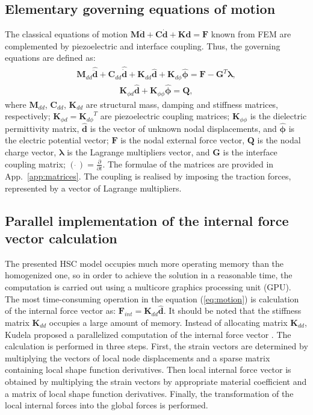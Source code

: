 \documentclass[sensors,article,submit,moreauthors,pdftex]{Definitions/mdpi}
\begin{document}
\subsection{Elementary governing equations of motion}
\label{sec:motion}
The classical equations of motion \(\textbf{M}\ddot{\textbf{d}} + \textbf{C}\dot{\textbf{d}} + \textbf{K}\textbf{d} = \textbf{F}\) known from FEM are complemented by piezoelectric and interface coupling. Thus, the governing equations are defined as:
\begin{eqnarray}
\textbf{M}_{dd} \widehat{\ddot{\textbf{d}}} + \textbf{C}_{dd} \widehat{\dot{\textbf{d}}} + \textbf{K}_{dd} \widehat{\textbf{d}} + \textbf{K}_{d\phi} \widehat{\boldsymbol{\phi}} = \textbf{F} - \textbf{G}^T \boldsymbol{\lambda},
\label{eq:motion}
\end{eqnarray}
\begin{eqnarray}
\textbf{K}_{\phi d}\widehat{\textbf{d}} + \textbf{K}_{\phi \phi} \widehat{\boldsymbol{\phi}} = \textbf{Q},
\label{eq:piezocoupling}
\end{eqnarray} 
where \(\textbf{M}_{dd}\), \(\textbf{C}_{dd}\), \(\textbf{K}_{dd}\) are structural mass, damping and stiffness matrices, respectively; \(\textbf{K}_{\phi d}={\textbf{K}_{d\phi}}^T\) are piezoelectric coupling matrices; \(\textbf{K}_{\phi \phi}\) is the dielectric permittivity matrix, \(\widehat{\textbf{d}}\) is the vector of unknown nodal displacements, and \(\widehat{\boldsymbol{\phi}}\) is the electric potential vector; \(\textbf{F}\) is the nodal external force vector, \(\textbf{Q}\) is the nodal charge vector, \(\boldsymbol{\lambda}\) is the Lagrange multipliers vector, and \(\textbf{G}\) is the interface coupling matrix; \((\dot{\ })=\frac{\partial}{\partial t}\).
The formulae of the matrices are provided in App.~\ref{app:matrices}.
The coupling is realised by imposing the traction forces, represented by a vector of Lagrange multipliers. 
\subsection{Parallel implementation of the internal force vector calculation}
\label{sec:f_internal}
The presented HSC model occupies much more operating memory than the homogenized one, so in order to achieve the solution in a reasonable time, the computation is carried out using a multicore graphics processing unit (GPU).  
The most time-consuming operation in the equation (\ref{eq:motion}) is calculation of the internal force vector as: \(\textbf{F}_{int}=\textbf{K}_{dd} \widehat{\textbf{d}}\).
It should be noted that the stiffness matrix \(\textbf{K}_{dd}\) occupies a large amount of memory.
Instead of allocating matrix \(\textbf{K}_{dd}\), Kudela proposed a parallelized computation of the internal force vector \cite{kudela2016parallel}.
The calculation is performed in three steps.
First, the strain vectors are determined by multiplying the vectors of local node displacements and a sparse matrix containing local shape function derivatives.
Then local internal force vector is obtained by multiplying the strain vectors by appropriate material coefficient and a matrix of local shape function derivatives.
Finally, the transformation of the local internal forces into the global forces is performed.
\end{document}
